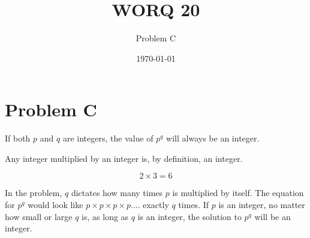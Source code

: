 \documentclass[a4paper]{article}
\title{WORQ 20}
\author{Problem C}
\date{\today}
\begin{document}
\maketitle

\section{Problem C}

If both $p$ and $q$ are integers, the value of $p^q$ will always be an integer.

Any integer multiplied by an integer is, by definition, an integer.

$$2\times3=6$$

In the problem, $q$ dictates how many times $p$ is multiplied by itself. The equation for $p^q$ would look like $p\times p\times p\times p$.... exactly $q$ times. If $p$ is an integer, no matter how small or large $q$ is, as long as $q$ is an integer, the solution to $p^q$ will be an integer.
\end{document}
